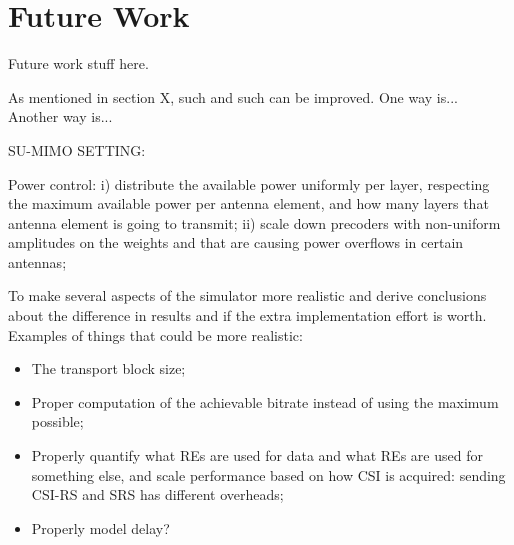 \section{Future Work}
\label{sec:future-work}

Future work stuff here.


As mentioned in section X, such and such can be improved. One way is... Another way is... 



SU-MIMO SETTING:

Power control: i) distribute the available power uniformly per layer, respecting the maximum available power per antenna element, and how many layers that antenna element is going to transmit; ii) scale down precoders with non-uniform amplitudes on the weights and that are causing power overflows in certain antennas; 







To make several aspects of the simulator more realistic and derive conclusions about the difference in results and if the extra implementation effort is worth. Examples of things that could be more realistic:
\begin{itemize}
    \item The transport block size;
    \item Proper computation of the achievable bitrate instead of using the maximum possible;
    \item Properly quantify what REs are used for data and what REs are used for something else, and scale performance based on how CSI is acquired: sending CSI-RS and SRS has different overheads;
    \item Properly model delay?
\end{itemize}

